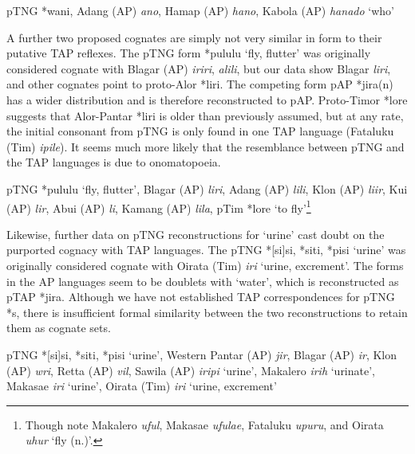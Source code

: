 \ea%
\label{ex:4:53}
\upshape    pTNG *wani, Adang (AP) \textit{ano}, Hamap (AP) \textit{hano}, Kabola (AP) \textit{hanado} `who' 
\z

A further two proposed cognates are simply not very similar in form to their putative TAP reflexes. The pTNG form *pululu `fly, flutter' was originally considered cognate with Blagar (AP) \textit{iriri}, \textit{alili}, but our data show Blagar \textit{liri}, and other cognates point to proto-Alor *liri. The competing form pAP *jira(n) has a wider distribution and is therefore reconstructed to pAP. Proto-Timor *lore suggests that Alor-Pantar *liri is older than previously assumed, but at any rate, the initial consonant from pTNG is only found in one TAP language (Fataluku (Tim) \textit{ipile}). It seems much more likely that the resemblance between pTNG and the TAP languages is due to onomatopoeia.

\ea%
\label{ex:4:54}
\upshape    pTNG *pululu `fly, flutter', Blagar (AP) \textit{liri}, Adang (AP) \textit{lili}\textit{{\textglotstop}}, Klon (AP) \textit{liir}, Kui (AP) \textit{lir}, Abui (AP) \textit{li}\textit{{\textglotstop}}, Kamang (AP) \textit{lila}, pTim *lore `to fly'\footnote{Though note Makalero \textit{uful}, Makasae \textit{ufulae}, Fataluku \textit{upuru}, and Oirata \textit{uhur} `fly (n.)'. }  
\z

Likewise, further data on pTNG reconstructions for `urine' cast doubt on the purported cognacy with TAP languages. The pTNG *[si]si, *siti, *pisi `urine' was originally considered cognate with Oirata (Tim) \textit{iri} `urine, excrement'. The forms in the AP languages seem to be doublets with `water', which is reconstructed as pTAP *jira. Although we have not established TAP correspondences for pTNG *s, there is insufficient formal similarity between the two reconstructions to retain them as cognate sets.

\ea%
\label{ex:4:55}
\upshape    pTNG *[si]si, *siti, *pisi `urine', Western Pantar (AP) \textit{jir}, Blagar (AP) \textit{ir}, Klon (AP) \textit{wri}, Retta (AP) \textit{vil}, Sawila (AP) \textit{iripi{\ng}} `urine', Makalero \textit{irih }`urinate', Makasae \textit{iri }`urine', Oirata (Tim) \textit{iri} `urine, excrement'  
\z

